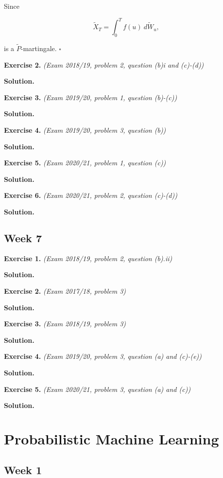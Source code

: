 \documentclass[
]{book}
\begin{document}
Since

\[
\tilde{X}_T=\int_0^Tf(u)\ d\tilde{W}_u,
\]

is a \(\tilde{P}\)-martingale. \(\square\)

\textbf{Exercise 2.} \emph{(Exam 2018/19, problem 2, question (b)i and (c)-(d))}

\textbf{Solution.}

\textbf{Exercise 3.} \emph{(Exam 2019/20, problem 1, question (b)-(c))}

\textbf{Solution.}

\textbf{Exercise 4.} \emph{(Exam 2019/20, problem 3, question (b))}

\textbf{Solution.}

\textbf{Exercise 5.} \emph{(Exam 2020/21, problem 1, question (c))}

\textbf{Solution.}

\textbf{Exercise 6.} \emph{(Exam 2020/21, problem 2, question (c)-(d))}

\textbf{Solution.}

\hypertarget{week-7}{%
\section{Week 7}\label{week-7}}

\textbf{Exercise 1.} \emph{(Exam 2018/19, problem 2, question (b).ii)}

\textbf{Solution.}

\textbf{Exercise 2.} \emph{(Exam 2017/18, problem 3)}

\textbf{Solution.}

\textbf{Exercise 3.} \emph{(Exam 2018/19, problem 3)}

\textbf{Solution.}

\textbf{Exercise 4.} \emph{(Exam 2019/20, problem 3, question (a) and (c)-(e))}

\textbf{Solution.}

\textbf{Exercise 5.} \emph{(Exam 2020/21, problem 3, question (a) and (c))}

\textbf{Solution.}

\hypertarget{probabilistic-machine-learning}{%
\chapter{Probabilistic Machine Learning}\label{probabilistic-machine-learning}}

\hypertarget{week-1-1}{%
\section{Week 1}\label{week-1-1}}
\end{document}
